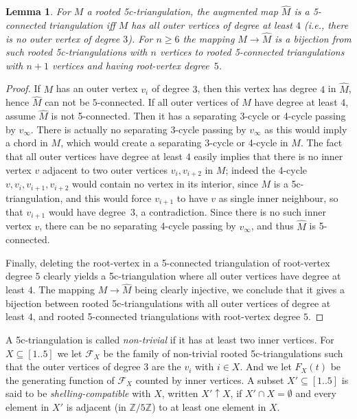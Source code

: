 \documentclass[letter]{amsart}
\numberwithin{theo}{section}
\newtheorem{lemma}[theo]{Lemma}
\theoremstyle{remark}
\def\cF{\mathcal{F}}
\begin{document}
\begin{lemma}\label{lem:5co}
For $M$ a rooted 5c-triangulation, the augmented map $\hat{M}$ is a 5-connected triangulation iff $M$ has all outer vertices of degree at least $4$ (i.e., there is no outer vertex of degree $3$). For $n\geq 6$ the mapping $M\to\hat{M}$ is a bijection from such rooted 5c-triangulations with $n$ vertices to rooted 5-connected triangulations with $n+1$ vertices and having root-vertex degree~$5$. 
\end{lemma} 
\begin{proof}
If $M$ has an outer vertex $v_i$ of degree $3$, then this vertex has degree $4$ in $\hat{M}$, hence $\hat{M}$ can not be $5$-connected.
If all outer vertices of $M$ have degree at least $4$, assume $\hat{M}$ is not 
5-connected. Then it has a separating 3-cycle or 4-cycle passing by $v_{\infty}$. 
There is actually no separating 3-cycle passing by $v_{\infty}$ as this would imply a chord in $M$, which would create a separating 3-cycle or 4-cycle in $M$. 
The fact that all outer vertices have degree at least $4$ easily implies that there is no inner vertex $v$ adjacent to two outer vertices $v_i,v_{i+2}$ in $M$; indeed the 4-cycle $v,v_i,v_{i+1},v_{i+2}$ would contain no vertex in its interior, since $M$ is a 5c-triangulation, and this would force $v_{i+1}$ to have $v$ as single inner neighbour, so that $v_{i+1}$ would have degree~$3$, a contradiction. 
Since there is no such inner vertex $v$, there can be no separating 4-cycle passing by $v_{\infty}$, and thus $\hat{M}$ is 5-connected.   

Finally, deleting the root-vertex in a 5-connected triangulation of root-vertex degree $5$ clearly yields a 5c-triangulation where all outer vertices have degree at least $4$. The mapping $M\to\hat{M}$ being clearly injective, we conclude that it gives a bijection between rooted 5c-triangulations with all outer vertices of degree at least $4$, and rooted 5-connected triangulations with root-vertex degree $5$. 
\end{proof}

A 5c-triangulation is called \emph{non-trivial} if it has at least two inner vertices. 
For $X\subseteq[1..5]$ we let $\cF_X$ be the family of non-trivial rooted 5c-triangulations 
such that the outer vertices of degree $3$ are the $v_i$ with $i\in X$. And we let $F_X(t)$ be the generating function of $\cF_X$ counted by inner vertices. 
A subset $X'\subseteq[1..5]$ is said to be \emph{shelling-compatible} with $X$, written $X'\uparrow X$, if $X'\cap X=\emptyset$ and every element in $X'$ is adjacent (in $\mathbb{Z}/5\mathbb{Z}$) to at least one element in $X$.
\end{document}
